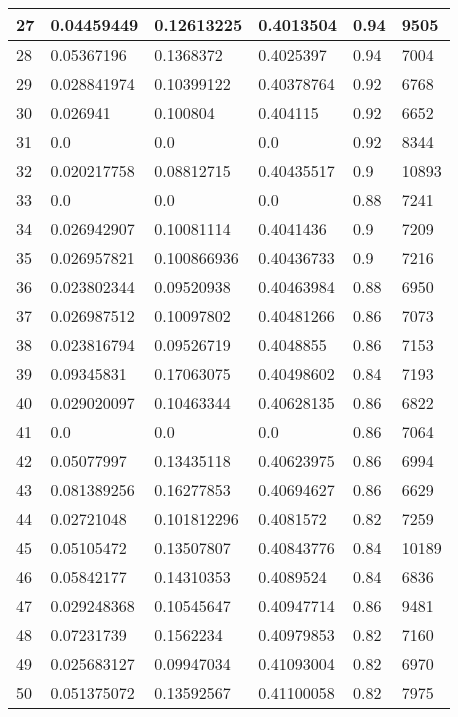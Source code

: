 \begin{longtable}{|l|l|l|l|l|l|}
27 & 0.04459449 & 0.12613225 & 0.4013504 & 0.94 & 9505 \\ \hline 
28 & 0.05367196 & 0.1368372 & 0.4025397 & 0.94 & 7004 \\ \hline 
29 & 0.028841974 & 0.10399122 & 0.40378764 & 0.92 & 6768 \\ \hline 
30 & 0.026941 & 0.100804 & 0.404115 & 0.92 & 6652 \\ \hline 
31 & 0.0 & 0.0 & 0.0 & 0.92 & 8344 \\ \hline 
32 & 0.020217758 & 0.08812715 & 0.40435517 & 0.9 & 10893 \\ \hline 
33 & 0.0 & 0.0 & 0.0 & 0.88 & 7241 \\ \hline 
34 & 0.026942907 & 0.10081114 & 0.4041436 & 0.9 & 7209 \\ \hline 
35 & 0.026957821 & 0.100866936 & 0.40436733 & 0.9 & 7216 \\ \hline 
36 & 0.023802344 & 0.09520938 & 0.40463984 & 0.88 & 6950 \\ \hline 
37 & 0.026987512 & 0.10097802 & 0.40481266 & 0.86 & 7073 \\ \hline 
38 & 0.023816794 & 0.09526719 & 0.4048855 & 0.86 & 7153 \\ \hline 
39 & 0.09345831 & 0.17063075 & 0.40498602 & 0.84 & 7193 \\ \hline 
40 & 0.029020097 & 0.10463344 & 0.40628135 & 0.86 & 6822 \\ \hline 
41 & 0.0 & 0.0 & 0.0 & 0.86 & 7064 \\ \hline 
42 & 0.05077997 & 0.13435118 & 0.40623975 & 0.86 & 6994 \\ \hline 
43 & 0.081389256 & 0.16277853 & 0.40694627 & 0.86 & 6629 \\ \hline 
44 & 0.02721048 & 0.101812296 & 0.4081572 & 0.82 & 7259 \\ \hline 
45 & 0.05105472 & 0.13507807 & 0.40843776 & 0.84 & 10189 \\ \hline 
46 & 0.05842177 & 0.14310353 & 0.4089524 & 0.84 & 6836 \\ \hline 
47 & 0.029248368 & 0.10545647 & 0.40947714 & 0.86 & 9481 \\ \hline 
48 & 0.07231739 & 0.1562234 & 0.40979853 & 0.82 & 7160 \\ \hline 
49 & 0.025683127 & 0.09947034 & 0.41093004 & 0.82 & 6970 \\ \hline 
50 & 0.051375072 & 0.13592567 & 0.41100058 & 0.82 & 7975 \\ \hline 
\end{longtable}